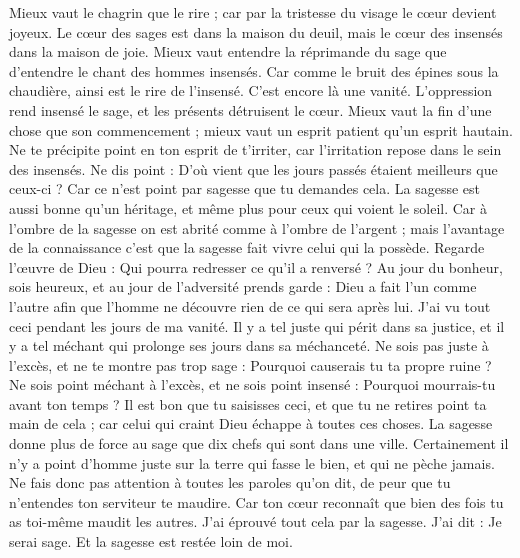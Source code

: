 \begin{multicols}{2}
Mieux vaut le chagrin que le rire ; car par la tristesse du visage le cœur devient joyeux.
Le cœur des sages est dans la maison du deuil, mais le cœur des insensés dans la maison de joie.
Mieux vaut entendre la réprimande du sage que d'entendre le chant des hommes insensés.
Car comme le bruit des épines sous la chaudière, ainsi est le rire de l’insensé. C’est encore là une vanité.
L'oppression rend insensé le sage, et les présents détruisent le cœur.
Mieux vaut la fin d'une chose que son commencement ; mieux vaut un esprit patient qu'un esprit hautain.
Ne te précipite point en ton esprit de t’irriter, car l’irritation repose dans le sein des insensés.
Ne dis point : D'où vient que les jours passés étaient meilleurs que ceux-ci ? Car ce n’est point par sagesse que tu demandes cela.
La sagesse est aussi bonne qu’un héritage, et même plus pour ceux qui voient le soleil.
Car à l'ombre de la sagesse on est abrité comme à l'ombre de l'argent ; mais l’avantage de la connaissance c’est que la sagesse fait vivre celui qui la possède.
Regarde l'œuvre de Dieu : Qui pourra redresser ce qu'il a renversé ?
Au jour du bonheur, sois heureux, et au jour de l'adversité prends garde : Dieu a fait l'un comme l'autre afin que l'homme ne découvre rien de ce qui sera après lui.
J'ai vu tout ceci pendant les jours de ma vanité. Il y a tel juste qui périt dans sa justice, et il y a tel méchant qui prolonge ses jours dans sa méchanceté.
Ne sois pas juste à l’excès, et ne te montre pas trop sage : Pourquoi causerais tu ta propre ruine ?
Ne sois point méchant à l’excès, et ne sois point insensé : Pourquoi mourrais-tu avant ton temps ?
Il est bon que tu saisisses ceci, et que tu ne retires point ta main de cela ; car celui qui craint Dieu échappe à toutes ces choses.
La sagesse donne plus de force au sage que dix chefs qui sont dans une ville.
Certainement il n'y a point d'homme juste sur la terre qui fasse le bien, et qui ne pèche jamais.
Ne fais donc pas attention à toutes les paroles qu'on dit, de peur que tu n'entendes ton serviteur te maudire.
Car ton cœur reconnaît que bien des fois tu as toi-même maudit les autres.
J'ai éprouvé tout cela par la sagesse. J'ai dit : Je serai sage. Et la sagesse est restée loin de moi.

\end{multicols}
